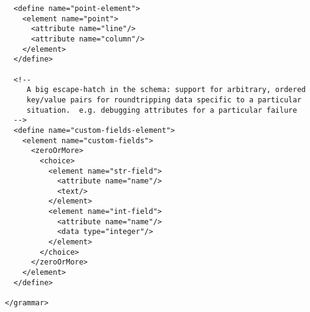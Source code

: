 \begin{lstlisting}
  <define name="point-element">
    <element name="point">
      <attribute name="line"/>
      <attribute name="column"/>
    </element>
  </define>

  <!--
     A big escape-hatch in the schema: support for arbitrary, ordered
     key/value pairs for roundtripping data specific to a particular
     situation.  e.g. debugging attributes for a particular failure
  -->
  <define name="custom-fields-element">
    <element name="custom-fields">
      <zeroOrMore>
        <choice>
          <element name="str-field">
            <attribute name="name"/>
            <text/>
          </element>
          <element name="int-field">
            <attribute name="name"/>
            <data type="integer"/>
          </element>
        </choice>
      </zeroOrMore>
    </element>
  </define>

</grammar>
\end{lstlisting}
